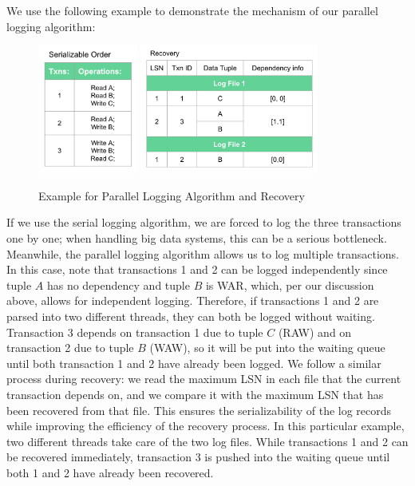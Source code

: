 We use the following example to demonstrate the mechanism of our parallel logging algorithm: 
\begin{figure}[!h]
\caption{Example for Parallel Logging Algorithm and Recovery}
\centering
\includegraphics[height=120pt]{Parallel.png}
\hspace{20pt}
\includegraphics[height=120pt]{Parallel_re.png}
\end{figure}\par
If we use the serial logging algorithm, we are forced to log the three transactions one by one; when handling big data systems, this can be a serious bottleneck. Meanwhile, the parallel logging algorithm allows us to log multiple transactions. In this case, note that transactions 1 and 2 can be logged independently since tuple $A$ has no dependency and tuple $B$ is WAR, which, per our discussion above, allows for independent logging. Therefore, if transactions 1 and 2 are parsed into two different threads, they can both be logged without waiting. Transaction 3 depends on transaction 1 due to tuple $C$ (RAW) and on transaction 2 due to tuple $B$ (WAW), so it will be put into the waiting queue until both transaction 1 and 2 have already been logged. 
We follow a similar process during recovery: we read the maximum LSN in each file that the current transaction depends on, and we compare it with the maximum LSN that has been recovered from that file. This ensures the serializability of the log records while improving the efficiency of the recovery process. In this particular example, two different threads take care of the two log files. While transactions 1 and 2 can be recovered immediately, transaction 3 is pushed into the waiting queue until both 1 and 2 have already been recovered.\par